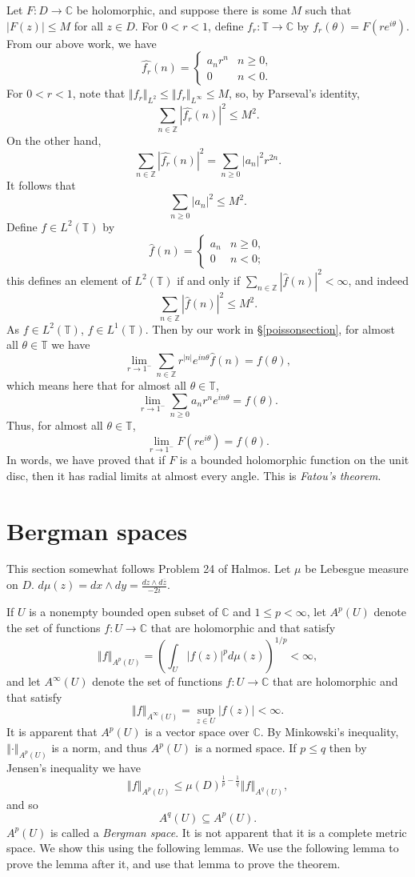 \documentclass{article}
\newcommand{\norm}[1]{\left\Vert #1 \right\Vert}
\theoremstyle{definition}
\begin{document}
Let $F:D \to \mathbb{C}$ be holomorphic, and suppose there is some $M$ such that $|F(z)| \leq M$ for all $z \in D$. 
For $0<r<1$, define $f_r:\mathbb{T} \to \mathbb{C}$ by $f_r(\theta)=F(re^{i\theta})$. 
From our above work, we have 
\[
\widehat{f_r}(n)=\begin{cases}
a_n r^n&n \geq 0,\\
0&n<0.
\end{cases}
\]
For $0<r<1$, note that $\norm{f_r}_{L^2} \leq \norm{f_r}_{L^\infty} \leq M$, so, by Parseval's identity,
\[
\sum_{n \in \mathbb{Z}} |\widehat{f_r}(n)|^2  \leq M^2.
\]
On the other hand,
\[
\sum_{n \in \mathbb{Z}} |\widehat{f_r}(n)|^2= \sum_{n \geq 0} |a_n|^2 r^{2n}.
\]
It follows that
\[
\sum_{n \geq 0} |a_n|^2 \leq M^2.
\]
Define $f \in L^2(\mathbb{T})$ by
\[
\hat{f}(n)=\begin{cases}
a_n&n \geq 0,\\
0&n<0;
\end{cases}
\]
 this  defines an element of $L^2(\mathbb{T})$ if and only if $\sum_{n \in \mathbb{Z}} |\hat{f}(n)|^2< \infty$, and indeed
 \[
 \sum_{n \in \mathbb{Z}} |\hat{f}(n)|^2 \leq M^2.
 \]
 As $f \in L^2(\mathbb{T})$, $f \in L^1(\mathbb{T})$.  Then
 by our work in \S \ref{poissonsection}, for almost all $\theta \in \mathbb{T}$ we have
 \[
 \lim_{r \to 1^-} \sum_{n \in \mathbb{Z}}  r^{|n|} e^{in\theta}\hat{f}(n) = f(\theta),
 \]
 which  means here that for almost all $\theta \in \mathbb{T}$,
 \[
 \lim_{r \to 1^-} \sum_{n \geq 0} a_n r^n e^{in\theta} = f(\theta).
 \]
Thus, for almost all $\theta \in \mathbb{T}$,
\[
\lim_{r \to 1^-} F(re^{i\theta}) = f(\theta).
\]
In words, we have proved that if $F$ is a bounded holomorphic function on the unit disc, then it has radial limits at almost every angle.
This is {\em Fatou's theorem}.


\section{Bergman spaces}
This section somewhat follows Problem 24 of Halmos.
Let $\mu$ be Lebesgue measure on $D$. $d\mu(z)=dx \wedge dy = \frac{dz \wedge d\overline{z}}{-2i}$.

If $U$ is a  nonempty bounded open subset of $\mathbb{C}$ and $1 \leq p < \infty$, let $A^p(U)$ denote the set of functions $f:U \to \mathbb{C}$ that are holomorphic and
that satisfy
\[
\norm{f}_{A^p(U)}  = \left( \int_U |f(z)|^p d\mu(z) \right)^{1/p} < \infty,
\]
and let $A^\infty(U)$ denote the set of functions $f:U \to \mathbb{C}$ that are holomorphic and that satisfy
\[
\norm{f}_{A^\infty(U)} = \sup_{z \in U} |f(z)| < \infty.
\]
It is apparent that $A^p(U)$ is a vector space over $\mathbb{C}$.
By Minkowski's inequality, $\norm{\cdot}_{A^p(U)}$  is a norm, and thus $A^p(U)$ is a normed space.
If $p \leq q$ then by Jensen's inequality we have 
\[
\norm{f}_{A^p(U)} \leq \mu(D)^{\frac{1}{p}-\frac{1}{q}} \norm{f}_{A^q(U)},
\]
and so
\[
A^q(U) \subseteq A^p(U).
\]
$A^p(U)$ is called a {\em Bergman space}. It is not apparent that it is a complete metric space. We show this using the following lemmas.
We use the following lemma to prove the lemma after it, and use that lemma to prove the theorem.
\end{document}
